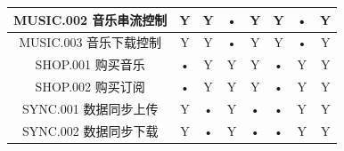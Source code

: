 \begin{table}[htbp]
\begin{tabular}{|c|c|c|c|c|c|c|c|}
    \hline
MUSIC.002 音乐串流控制 &   Y &    Y   & •    &     Y    &    Y     &  •   &   Y      \\
    \hline
MUSIC.003 音乐下载控制 &   Y &    Y   & •    &     Y    &    Y     &  •   &   Y      \\
    \hline
    SHOP.001 购买音乐  &   • &    Y   & Y    &     Y    &    •     &  Y   &   Y      \\
    \hline
    SHOP.002 购买订阅  &   • &    Y   & Y    &     Y    &    •     &  Y   &   Y      \\
    \hline
SYNC.001 数据同步上传  &   Y &    •   & Y    &     •    &    •     &  Y   &   Y      \\
    \hline
SYNC.002 数据同步下载  &   Y &    •   & Y    &     •    &    •     &  Y   &   Y      \\
    \hline

\end{tabular}
\end{table}